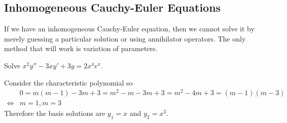 \documentclass[notes]{subfiles}
\begin{document}
\subsection{Inhomogeneous Cauchy-Euler Equations}
If we have an inhomogeneous Cauchy-Euler equation, then we cannot solve it by merely guessing a particular solution or using annihilator operators. The only method that will work is variation of parameters.

\begin{exercise}
    Solve $x^2y'' - 3xy' + 3y = 2x^4e^x$.
\end{exercise}
\begin{solution}
    Consider the characteristic polynomial so
    \begin{align*}
        &0 = m(m - 1) - 3m + 3 = m^2 - m - 3m + 3 = m^2 - 4m + 3 = (m - 1)(m - 3) \\
        \iff& m = 1, m = 3
    \end{align*}
    Therefore the basis solutions are $y_1 = x$ and $y_2 = x^3$.
    

\end{solution}
\end{document}
